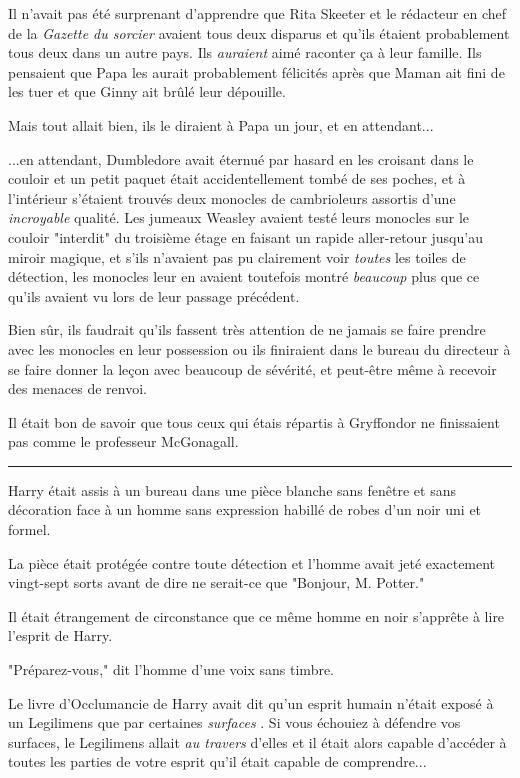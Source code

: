 Il n'avait pas été surprenant d'apprendre que Rita Skeeter et le rédacteur en chef de la \emph{Gazette du sorcier}  avaient tous deux disparus et qu'ils étaient probablement tous deux dans un autre pays. Ils \emph{auraient}  aimé raconter ça à leur famille. Ils pensaient que Papa les aurait probablement félicités après que Maman ait fini de les tuer et que Ginny ait brûlé leur dépouille.

Mais tout allait bien, ils le diraient à Papa un jour, et en attendant...

...en attendant, Dumbledore avait éternué par hasard en les croisant dans le couloir et un petit paquet était accidentellement tombé de ses poches, et à l'intérieur s'étaient trouvés deux monocles de cambrioleurs assortis d'une \emph{incroyable}  qualité. Les jumeaux Weasley avaient testé leurs monocles sur le couloir "interdit" du troisième étage en faisant un rapide aller-retour jusqu'au miroir magique, et s'ils n'avaient pas pu clairement voir \emph{toutes}  les toiles de détection, les monocles leur en avaient toutefois montré \emph{beaucoup}  plus que ce qu'ils avaient vu lors de leur passage précédent.

Bien sûr, ils faudrait qu'ils fassent très attention de ne jamais se faire prendre avec les monocles en leur possession ou ils finiraient dans le bureau du directeur à se faire donner la leçon avec beaucoup de sévérité, et peut-être même à recevoir des menaces de renvoi.

Il était bon de savoir que tous ceux qui étais répartis à Gryffondor ne finissaient pas comme le professeur McGonagall.
\par\noindent\rule{\textwidth}{0.4pt}
Harry était assis à un bureau dans une pièce blanche sans fenêtre et sans décoration face à un homme sans expression habillé de robes d'un noir uni et formel.

La pièce était protégée contre toute détection et l'homme avait jeté exactement vingt-sept sorts avant de dire ne serait-ce que "Bonjour, M. Potter."

Il était étrangement de circonstance que ce même homme en noir s'apprête à lire l'esprit de Harry.

"Préparez-vous," dit l'homme d'une voix sans timbre.

Le livre d'Occlumancie de Harry avait dit qu'un esprit humain n'était exposé à un Legilimens que par certaines \emph{surfaces} . Si vous échouiez à défendre vos surfaces, le Legilimens allait \emph{au travers}  d'elles et il était alors capable d'accéder à toutes les parties de votre esprit qu'il était capable de comprendre...

